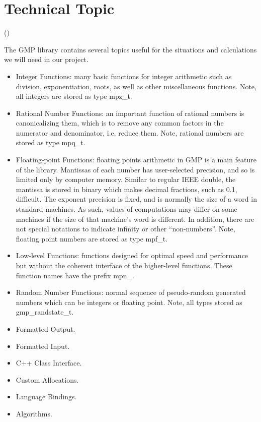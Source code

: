 \section{Technical Topic}
(\dd) \bigskip



The GMP library contains several topics useful for the
situations and calculations we will need in our project.

\begin{itemize}

\item Integer Functions: many basic functions for integer
  arithmetic such as division, exponentiation, roots, as
  well as other miscellaneous functions. Note, all integers
  are stored as type mpz\_t.

\item Rational Number Functions: an important function of
  rational numbers is canonicalizing them, which is to
  remove any common factors in the numerator and
  denominator, i.e. reduce them. Note, rational numbers are
  stored as type mpq\_t.

\item Floating-point Functions: floating points arithmetic
  in GMP is a main feature of the library. Mantissas of each
  number has user-selected precision, and so is limited only
  by computer memory. Similar to regular IEEE double, the
  mantissa is stored in binary which makes decimal
  fractions, such as 0.1, difficult. The exponent precision
  is fixed, and is normally the size of a word in standard
  machines. As such, values of computations may differ on
  some machines if the size of that machine's word is
  different. In addition, there are not special
  notations to indicate infinity or other ``non-numbers''.
  Note, floating point numbers are stored as type mpf\_t.

\item Low-level Functions: functions designed for optimal
  speed and performance but without the coherent interface
  of the higher-level functions.
  These function names have the prefix mpn\_.

\item Random Number Functions: normal sequence of
  pseudo-random generated numbers which can be integers or
  floating point. Note, all types stored as
  gmp\_randstate\_t.

\item Formatted Output.
\item Formatted Input.
\item C++ Class Interface.
\item Custom Allocations.
\item Language Bindings.
\item Algorithms.

\end{itemize}
